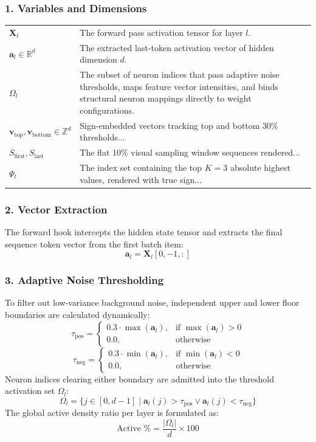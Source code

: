 \documentclass[10pt,conference]{IEEEtran}
\begin{document}
\subsubsection*{1. Variables and Dimensions}
\begin{tabularx}{\linewidth}{@{} p{7em} X @{}}
    \toprule
    $\mathbf{X}_l$ & The forward pass activation tensor for layer $l$. \\
    \addlinespace
    $\mathbf{a}_l \in \mathbb{R}^d$ & The extracted last-token activation vector of hidden dimension $d$. \\
    \addlinespace
    $\Omega_l$ & The subset of neuron indices that pass adaptive noise thresholds, maps feature vector intensities, and binds structural neuron mappings directly to weight configurations. \\
    \addlinespace
    $\mathbf{v}_{\text{top}}, \mathbf{v}_{\text{bottom}} \in \mathbb{Z}^d$ & Sign-embedded vectors tracking top and bottom 30\% thresholds... \\
    \addlinespace
    $S_{\text{first}}, S_{\text{last}}$ & The flat 10\% visual sampling window sequences rendered... \\
    \addlinespace
    $\Psi_l$ & The index set containing the top $K=3$ absolute highest values, rendered with true sign... \\
    \bottomrule
\end{tabularx}
\medskip

\subsubsection*{2. Vector Extraction}
The forward hook intercepts the hidden state tensor and extracts the final sequence token vector from the first batch item:
\[
\mathbf{a}_l = \mathbf{X}_{l}[0, -1, :]
\]

\subsubsection*{3. Adaptive Noise Thresholding}
To filter out low-variance background noise, independent upper and lower floor boundaries are calculated dynamically:
\[
\tau_{\text{pos}} = \begin{cases} 0.3 \cdot \max(\mathbf{a}_l), & \text{if } \max(\mathbf{a}_l) > 0 \\ 0.0, & \text{otherwise} \end{cases}
\]
\[
\tau_{\text{neg}} = \begin{cases} 0.3 \cdot \min(\mathbf{a}_l), & \text{if } \min(\mathbf{a}_l) < 0 \\ 0.0, & \text{otherwise} \end{cases}
\]
Neuron indices clearing either boundary are admitted into the threshold activation set $\Omega_l$:
\[
\Omega_l = \lbrace j \in [0, d-1] \mid \mathbf{a}_l(j) > \tau_{\text{pos}} \lor \mathbf{a}_l(j) < \tau_{\text{neg}} \rbrace
\]
The global active density ratio per layer is formulated as:
\[
\text{Active \%} = \frac{|\Omega_l|}{d} \times 100
\]
\end{document}
